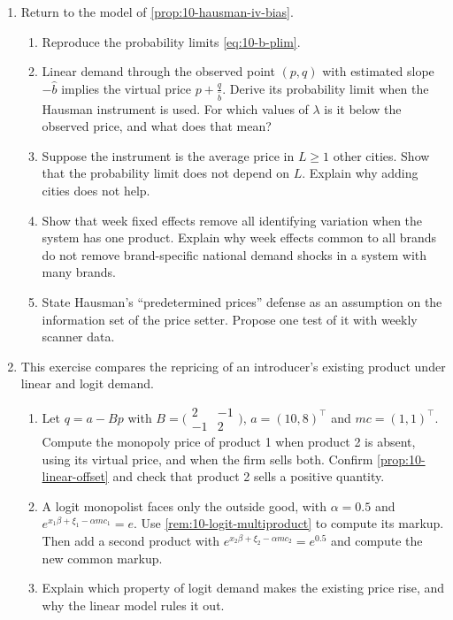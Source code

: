\begin{enumerate}[label=\arabic*., leftmargin=*, itemsep=6pt]
\item Return to the model of \cref{prop:10-hausman-iv-bias}.
\begin{enumerate}[label=(\alph*)]
  \item Reproduce the probability limits \eqref{eq:10-b-plim}.
  \item Linear demand through the observed point $(p,q)$ with estimated slope $-\hat b$ implies the virtual price
  $p + \frac{q}{\hat b}$. Derive its probability limit when the Hausman instrument is used. For which values of
  $\lambda$ is it below the observed price, and what does that mean?
  \item Suppose the instrument is the average price in $L \ge 1$ other cities. Show that the probability limit does
  not depend on $L$. Explain why adding cities does not help.
  \item Show that week fixed effects remove all identifying variation when the system has one product. Explain why
  week effects common to all brands do not remove brand-specific national demand shocks in a system with many
  brands.
  \item State Hausman's ``predetermined prices'' defense as an assumption on the information set of the price
  setter. Propose one test of it with weekly scanner data.
\end{enumerate}

\item This exercise compares the repricing of an introducer's existing product under linear and logit demand.
\begin{enumerate}[label=(\alph*)]
  \item Let $q = a - Bp$ with $B = \bigl(\begin{smallmatrix} 2 & -1\\ -1 & 2\end{smallmatrix}\bigr)$,
  $a = (10, 8)^\top$ and $mc = (1, 1)^\top$. Compute the monopoly price of product 1 when product 2 is absent,
  using its virtual price, and when the firm sells both. Confirm \cref{prop:10-linear-offset} and check that
  product 2 sells a positive quantity.
  \item A logit monopolist faces only the outside good, with $\alpha = 0.5$ and $e^{x_1\beta + \xi_1 - \alpha mc_1}
  = e$. Use \cref{rem:10-logit-multiproduct} to compute its markup. Then add a second product with
  $e^{x_2\beta + \xi_2 - \alpha mc_2} = e^{0.5}$ and compute the new common markup.
  \item Explain which property of logit demand makes the existing price rise, and why the linear model rules it
  out.
\end{enumerate}


\end{enumerate}
